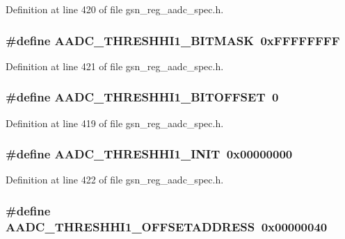 Definition at line 420 of file gsn\_\-reg\_\-aadc\_\-spec.h.

\hypertarget{a00543_ada57d438e762e8d96c76714b39cc21cc}{
\subsubsection[{AADC\_\-THRESHHI1\_\-BITMASK}]{\setlength{\rightskip}{0pt plus 5cm}\#define AADC\_\-THRESHHI1\_\-BITMASK~0xFFFFFFFF}}
\label{a00543_ada57d438e762e8d96c76714b39cc21cc}


Definition at line 421 of file gsn\_\-reg\_\-aadc\_\-spec.h.

\hypertarget{a00543_ab179fb56f331deeddf0ecf3841457ed6}{
\subsubsection[{AADC\_\-THRESHHI1\_\-BITOFFSET}]{\setlength{\rightskip}{0pt plus 5cm}\#define AADC\_\-THRESHHI1\_\-BITOFFSET~0}}
\label{a00543_ab179fb56f331deeddf0ecf3841457ed6}


Definition at line 419 of file gsn\_\-reg\_\-aadc\_\-spec.h.

\hypertarget{a00543_ae593b4b6d741b89d6ab14e6fc51034a4}{
\subsubsection[{AADC\_\-THRESHHI1\_\-INIT}]{\setlength{\rightskip}{0pt plus 5cm}\#define AADC\_\-THRESHHI1\_\-INIT~0x00000000}}
\label{a00543_ae593b4b6d741b89d6ab14e6fc51034a4}


Definition at line 422 of file gsn\_\-reg\_\-aadc\_\-spec.h.

\hypertarget{a00543_a17cff8ced56b3d7fe00645f3fddfff67}{
\subsubsection[{AADC\_\-THRESHHI1\_\-OFFSETADDRESS}]{\setlength{\rightskip}{0pt plus 5cm}\#define AADC\_\-THRESHHI1\_\-OFFSETADDRESS~0x00000040}}
\label{a00543_a17cff8ced56b3d7fe00645f3fddfff67}


